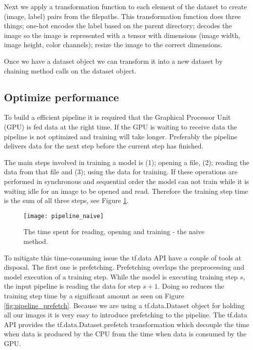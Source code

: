 \documentclass[thesis.tex]{subfiles}
\begin{document}
Next we apply a transformation function to each element of the dataset to create (image, label) pairs from the filepaths. This transformation function does three things; one-hot encodes the label based on the parent directory; decodes the image so the image is represented with a tensor with dimensions (image width, image height, color channels); resize the image to the correct dimensions. 

Once we have a dataset object we can transform it into a new dataset by chaining method calls on the dataset object.


\subsection{Optimize performance}
To build a efficient pipeline it is required that the Graphical Processor Unit (GPU) is fed data at the right time. If the GPU is waiting to receive data the pipeline is not optimized and training will take longer. Preferably the pipeline delivers data for the next step before the current step has finished. 

The main steps involved in training a model is (1); opening a file, (2); reading the data from that file and (3); using the data for training. If these operations are performed in synchronous and sequential order the model can not train while it is waiting idle for an image to be opened and read. Therefore the training step time is the sum of all three steps, see Figure \ref{fig:pipeline_naive}. 

\begin{figure} %
  \begin{center}
    \texttt{[image: pipeline\_naive]}
    \caption[Naive pipeline.]{The time spent for reading, opening and training - the naive method.}
    \label{fig:pipeline_naive}
  \end{center}
\end{figure}

To mitigate this time-consuming issue the tf.data API have a couple of tools at disposal. The first one is prefetching. 
Prefetching overlaps the preprocessing and model execution of a training step. While the model is executing training step $s$, the input pipeline is reading the data for step $s+1$. Doing so reduces the training step time by a significant amount as seen on Figure \ref{fig:pipeline_prefetch}.
Because we are using a tf.data.Dataset object for holding all our images it is very easy to introduce prefetching to the pipeline. The tf.data API provides the tf.data.Dataset.prefetch transformation which decouple the time when data is produced by the CPU from the time when data is consumed by the GPU. 
\end{document}
